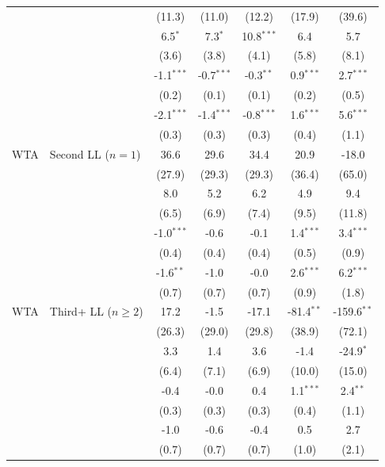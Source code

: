 \begin{tabular}{l l*{5}{c}}
  &  & (11.3) & (11.0) & (12.2) & (17.9) & (39.6) \\
  &  & 6.5$^{*}$ & 7.3$^{*}$ & 10.8$^{***}$ & 6.4 & 5.7 \\
  &  & (3.6) & (3.8) & (4.1) & (5.8) & (8.1) \\
  &  & -1.1$^{***}$ & -0.7$^{***}$ & -0.3$^{**}$ & 0.9$^{***}$ & 2.7$^{***}$ \\
  &  & (0.2) & (0.1) & (0.1) & (0.2) & (0.5) \\
  &  & -2.1$^{***}$ & -1.4$^{***}$ & -0.8$^{***}$ & 1.6$^{***}$ & 5.6$^{***}$ \\
  &  & (0.3) & (0.3) & (0.3) & (0.4) & (1.1) \\
[0.3em]
WTA & Second LL ($n=1$) & 36.6 & 29.6 & 34.4 & 20.9 & -18.0 \\
  &  & (27.9) & (29.3) & (29.3) & (36.4) & (65.0) \\
  &  & 8.0 & 5.2 & 6.2 & 4.9 & 9.4 \\
  &  & (6.5) & (6.9) & (7.4) & (9.5) & (11.8) \\
  &  & -1.0$^{***}$ & -0.6 & -0.1 & 1.4$^{***}$ & 3.4$^{***}$ \\
  &  & (0.4) & (0.4) & (0.4) & (0.5) & (0.9) \\
  &  & -1.6$^{**}$ & -1.0 & -0.0 & 2.6$^{***}$ & 6.2$^{***}$ \\
  &  & (0.7) & (0.7) & (0.7) & (0.9) & (1.8) \\
[0.3em]
WTA & Third+ LL ($n \geq 2$) & 17.2 & -1.5 & -17.1 & -81.4$^{**}$ & -159.6$^{**}$ \\
  &  & (26.3) & (29.0) & (29.8) & (38.9) & (72.1) \\
  &  & 3.3 & 1.4 & 3.6 & -1.4 & -24.9$^{*}$ \\
  &  & (6.4) & (7.1) & (6.9) & (10.0) & (15.0) \\
  &  & -0.4 & -0.0 & 0.4 & 1.1$^{***}$ & 2.4$^{**}$ \\
  &  & (0.3) & (0.3) & (0.3) & (0.4) & (1.1) \\
  &  & -1.0 & -0.6 & -0.4 & 0.5 & 2.7 \\
  &  & (0.7) & (0.7) & (0.7) & (1.0) & (2.1) \\
[0.3em]
\bottomrule
\end{tabular}
